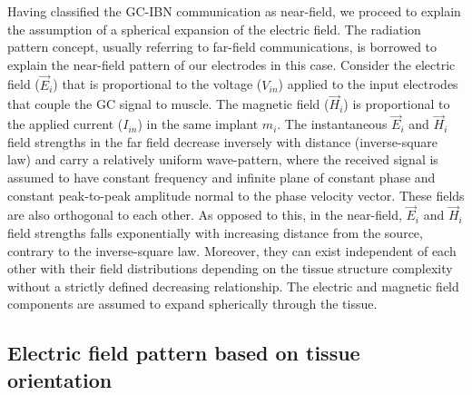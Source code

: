 Having classified the GC-IBN communication as near-field, we proceed to explain the assumption of a spherical expansion of the electric field. The radiation pattern concept, usually referring to far-field communications, is borrowed to explain the near-field pattern of our electrodes in this case. Consider the electric field ($\overrightarrow{E}_i$) that is proportional to the voltage ($V_{in}$) applied to the input electrodes that couple the GC signal to muscle. The magnetic field ($\overrightarrow{H}_i$) is proportional to the applied current ($I_{in}$) in the same implant $m_i$. The instantaneous $\overrightarrow{E}_i$ and $\overrightarrow{H}_i$ field strengths in the far field decrease inversely with distance (inverse-square law) and carry a relatively uniform wave-pattern, where the received signal is assumed to have constant frequency and infinite plane of constant phase and constant peak-to-peak amplitude normal to the phase velocity vector. These fields are also orthogonal to each other.
As opposed to this, in the near-field,  $\overrightarrow{E}_i$ and $\overrightarrow{H}_i$ field strengths falls exponentially with increasing distance from the source, contrary to the inverse-square law. 
Moreover, they can exist independent of each other with their field distributions depending on the tissue structure complexity without a strictly defined decreasing relationship. The electric and magnetic field components are assumed to expand spherically through the tissue.

\subsection{Electric field pattern based on tissue orientation} \label{electrode_pattern}

